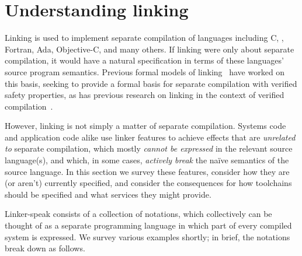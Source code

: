 \section{Understanding linking}
Linking is used to implement separate compilation 
of languages including C, \Cplusplus{}, Fortran, Ada, Objective-C, and
many others.
If linking were only about separate compilation, it would have a natural specification
in terms of these languages' source program semantics.
Previous formal models of linking~\cite{cardelli-program-1997, glew-type-safe-1999, machkasova-calculus-2000, wells-equational-2000, fagorzi-calculus-2007}
have worked on this basis, 
seeking to provide a formal basis for separate compilation with verified safety properties, as has
previous research on linking in the context of verified compilation~\cite{stewart-compositional-2015, kang-lightweight-2015}.

However, linking is not simply a matter of separate compilation.
Systems code and application code alike 
use linker features to achieve effects that are \emph{unrelated to} separate compilation,
which mostly \emph{cannot be expressed} in the relevant source language(s), 
and which, in some cases, \emph{actively break} the na\"ive semantics of the source language.
In this section we survey these features,
consider how they are (or aren't) currently specified, 
and consider the consequences for 
how toolchains should be specified and what services they might provide.

Linker-speak consists of a collection of notations,
which collectively can be thought of as a separate programming language
in which part of every compiled system is expressed.
We survey various examples shortly; in brief, the notations
break down as follows.

